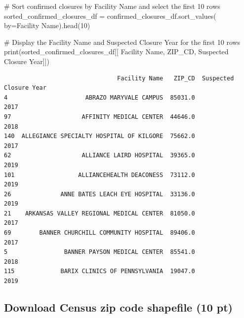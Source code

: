 \documentclass[
  letterpaper,
  DIV=11,
  numbers=noendperiod]{scrartcl}
\newenvironment{Shaded}{\begin{snugshade}}{\end{snugshade}}
\newcommand{\BuiltInTok}[1]{\textcolor[rgb]{0.00,0.23,0.31}{#1}}
\newcommand{\CommentTok}[1]{\textcolor[rgb]{0.37,0.37,0.37}{#1}}
\newcommand{\DecValTok}[1]{\textcolor[rgb]{0.68,0.00,0.00}{#1}}
\newcommand{\NormalTok}[1]{\textcolor[rgb]{0.00,0.23,0.31}{#1}}
\newcommand{\OperatorTok}[1]{\textcolor[rgb]{0.37,0.37,0.37}{#1}}
\newcommand{\StringTok}[1]{\textcolor[rgb]{0.13,0.47,0.30}{#1}}
\begin{document}
\begin{Shaded}
\begin{Highlighting}[]
\CommentTok{\# Sort confirmed closures by Facility Name and select the first 10 rows}
\NormalTok{sorted\_confirmed\_closures\_df }\OperatorTok{=}\NormalTok{ confirmed\_closures\_df.sort\_values(}
\NormalTok{    by}\OperatorTok{=}\StringTok{\textquotesingle{}Facility Name\textquotesingle{}}\NormalTok{).head(}\DecValTok{10}\NormalTok{)}

\CommentTok{\# Display the Facility Name and Suspected Closure Year for the first 10 rows}
\BuiltInTok{print}\NormalTok{(sorted\_confirmed\_closures\_df[[}
      \StringTok{\textquotesingle{}Facility Name\textquotesingle{}}\NormalTok{, }\StringTok{\textquotesingle{}ZIP\_CD\textquotesingle{}}\NormalTok{, }\StringTok{\textquotesingle{}Suspected Closure Year\textquotesingle{}}\NormalTok{]])}
\end{Highlighting}
\end{Shaded}

\begin{verbatim}
                                Facility Name   ZIP_CD  Suspected Closure Year
4                      ABRAZO MARYVALE CAMPUS  85031.0                    2017
97                    AFFINITY MEDICAL CENTER  44646.0                    2018
140  ALLEGIANCE SPECIALTY HOSPITAL OF KILGORE  75662.0                    2017
62                    ALLIANCE LAIRD HOSPITAL  39365.0                    2019
101                  ALLIANCEHEALTH DEACONESS  73112.0                    2019
26              ANNE BATES LEACH EYE HOSPITAL  33136.0                    2019
21    ARKANSAS VALLEY REGIONAL MEDICAL CENTER  81050.0                    2017
69        BANNER CHURCHILL COMMUNITY HOSPITAL  89406.0                    2017
5                BANNER PAYSON MEDICAL CENTER  85541.0                    2018
115             BARIX CLINICS OF PENNSYLVANIA  19047.0                    2019
\end{verbatim}

\subsection{Download Census zip code shapefile (10
pt)}\label{download-census-zip-code-shapefile-10-pt}
\end{document}
